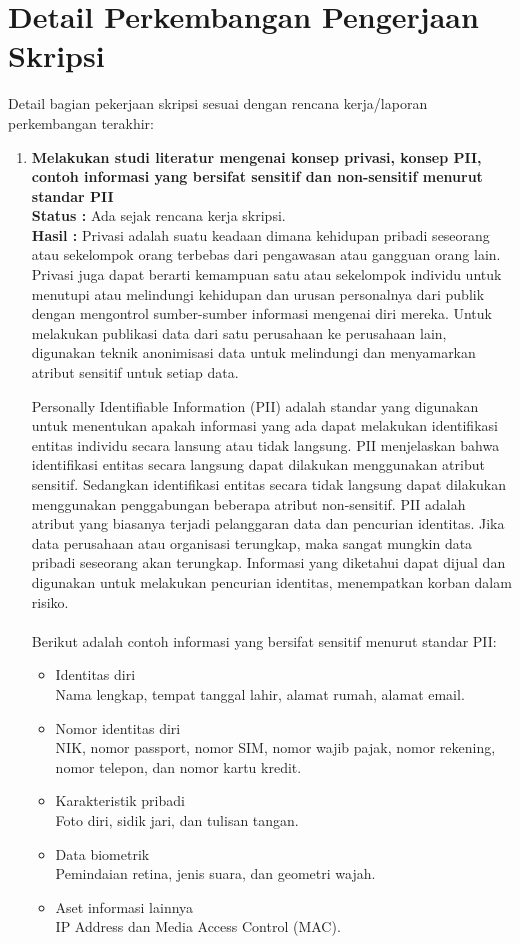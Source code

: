 \documentclass[a4paper,twoside]{article}
\begin{document}
\section{Detail Perkembangan Pengerjaan Skripsi}
Detail bagian pekerjaan skripsi sesuai dengan rencana kerja/laporan perkembangan terakhir:
	\begin{enumerate}
		\item \textbf{Melakukan studi literatur mengenai konsep privasi,  konsep PII, contoh informasi yang bersifat sensitif dan non-sensitif menurut standar PII}\\
		{\bf Status :} Ada sejak rencana kerja skripsi.\\
		{\bf Hasil :} Privasi adalah suatu keadaan dimana kehidupan pribadi seseorang atau sekelompok orang terbebas dari pengawasan atau gangguan orang lain. Privasi juga dapat berarti kemampuan satu atau sekelompok individu untuk menutupi atau melindungi kehidupan dan urusan personalnya dari publik dengan mengontrol sumber-sumber informasi mengenai diri mereka. Untuk melakukan publikasi data dari satu perusahaan ke perusahaan lain, digunakan teknik anonimisasi data untuk melindungi dan menyamarkan atribut sensitif untuk setiap data.
		
Personally Identifiable Information (PII) adalah standar yang digunakan untuk menentukan apakah informasi yang ada dapat melakukan identifikasi entitas individu secara lansung atau tidak langsung. PII menjelaskan bahwa identifikasi entitas secara langsung dapat dilakukan menggunakan atribut sensitif. Sedangkan identifikasi entitas secara tidak langsung dapat dilakukan menggunakan penggabungan beberapa atribut non-sensitif. PII adalah atribut  yang biasanya terjadi pelanggaran data dan pencurian identitas. Jika data perusahaan atau organisasi terungkap, maka sangat mungkin data pribadi seseorang akan terungkap. Informasi yang diketahui dapat dijual dan digunakan untuk melakukan pencurian identitas, menempatkan korban dalam risiko.
\\\\
Berikut adalah contoh informasi yang bersifat sensitif menurut standar PII:

\begin{itemize}
\item Identitas diri \\ 
Nama lengkap, tempat tanggal lahir, alamat rumah, alamat email.
\item Nomor identitas diri \\
NIK, nomor passport, nomor SIM, nomor wajib pajak, nomor rekening, nomor telepon, dan nomor kartu kredit.
\item Karakteristik pribadi  \\
Foto diri, sidik jari, dan tulisan tangan.
\item Data biometrik \\
Pemindaian retina, jenis suara, dan geometri wajah.
\item Aset informasi lainnya \\
IP Address dan Media Access Control (MAC). 
\end{itemize}


\end{enumerate}
\end{document}
